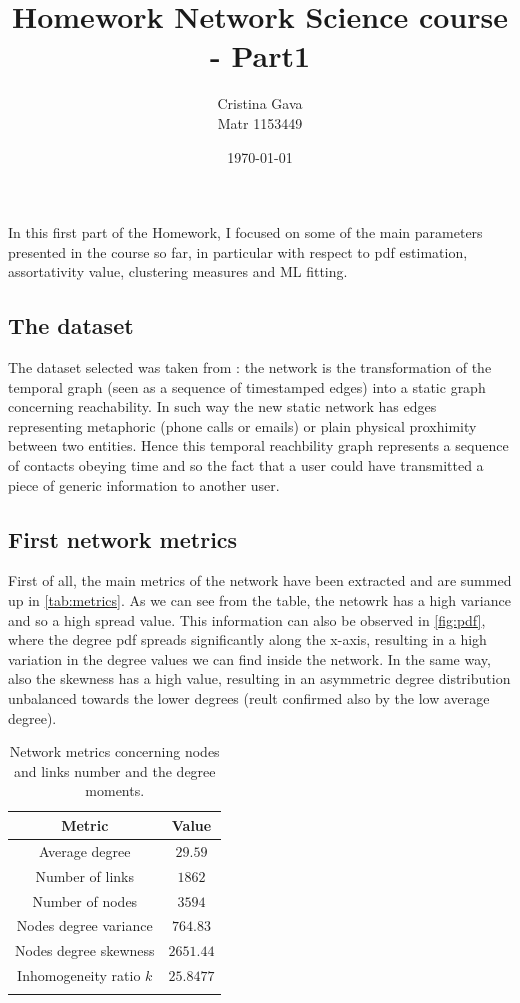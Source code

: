 \documentclass[12pt,a4paper]{article}
\title{\blue Homework Network Science course - Part1}
\author{Cristina Gava\\%
Matr 1153449}
\date{\today}
\begin{document}
\maketitle

In this first part of the Homework, I focused on some of the main parameters presented in the course so far, in particular with respect to pdf estimation, assortativity value, clustering measures and ML fitting.

\subsection*{The dataset}
The dataset selected was taken from \cite{repo}: the network is the transformation of the temporal graph (seen as a sequence of timestamped edges) into a static graph concerning reachability. In such way the new static network has edges representing metaphoric (phone calls or emails) or plain physical proxhimity between two entities. Hence this temporal reachbility graph represents a sequence of contacts obeying time and so the fact that a user could have transmitted a piece of generic information to another user.

\subsection*{First network metrics}
First of all, the main metrics of the network have been extracted and are summed up in \autoref{tab:metrics}. As we can see from the table, the netowrk has a high variance and so a high spread value. This information can also be observed in \autoref{fig:pdf}, where the degree pdf spreads significantly along the x-axis, resulting in a high variation in the degree values we can find inside the network. In the same way, also the skewness has a high value, resulting in an asymmetric degree distribution unbalanced towards the lower degrees (reult confirmed also by the low average degree).

\begin{table}
\centering
\begin{tabular}{c|c}
  \firsthline
  Metric & Value\\
  \hline
    Average degree & $29.59$\\
    Number of links & $1862$\\
    Number of nodes & $3594$\\
    Nodes degree variance & $764.83$\\
    Nodes degree skewness & $2651.44$\\
    Inhomogeneity ratio $k$ & $25.8477$\\
  \lasthline
\end{tabular}
\caption{Network metrics concerning nodes and links number and the degree moments.}
\label{tab:metrics}
\end{table}
\end{document}
